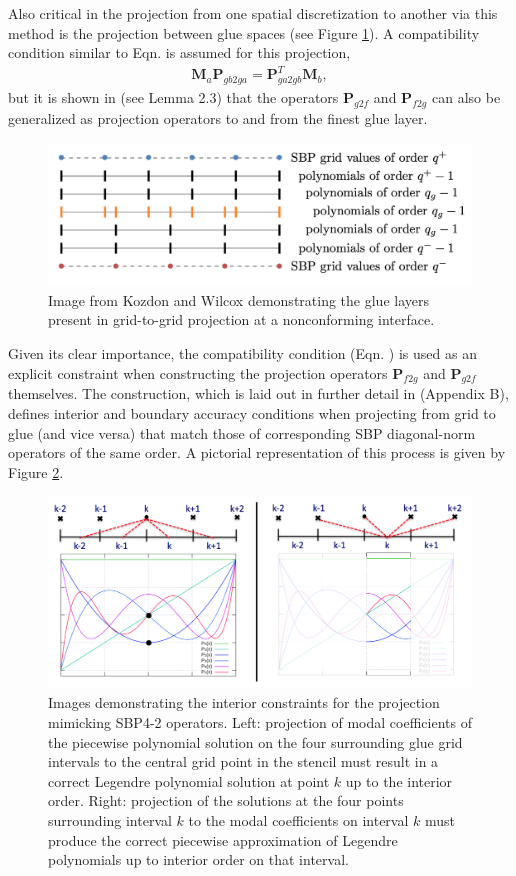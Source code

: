 Also critical in the projection from one spatial discretization to another via this
method is the projection between glue spaces (see Figure \ref{fig:glue_layers}). A
compatibility condition similar to Eqn.  is assumed for this projection,
\begin{align}
	\pmb{M}_{a}\pmb{P}_{gb2ga} = \pmb{P}_{ga2gb}^{T}\pmb{M}_{b}, \label{eq:compat_glues}
\end{align}
but it is shown in \cite{kozdon2016stable} (see Lemma 2.3) that the operators $\pmb{P}_{g2f}$ and
$\pmb{P}_{f2g}$ can also be generalized as projection operators to and from the finest
glue layer.
\begin{figure}
\centering
\includegraphics[width=0.8\linewidth,trim=4 4 4 4,clip]{figures/glue_layers.png}
\caption{Image from Kozdon and Wilcox \cite{kozdon2016stable} demonstrating the glue
         layers present in grid-to-grid projection at a nonconforming interface.}
\label{fig:glue_layers}
\end{figure}
Given its clear importance, the compatibility condition (Eqn. ) is used as an explicit
constraint when constructing the projection operators $\pmb{P}_{f2g}$ and $\pmb{P}_{g2f}$
themselves. The construction, which is laid out in further detail in \cite{kozdon2016stable} (Appendix B),
defines interior and boundary accuracy conditions when projecting from grid to glue
(and vice versa) that match those of corresponding SBP diagonal-norm operators of the
same order. A pictorial representation of this process is given by Figure \ref{fig:projection_layout}.
\begin{figure}
\centering
\includegraphics[width=0.9\linewidth,trim=4 4 4 4,clip]{figures/projection_layout.png}
\caption{Images demonstrating the interior constraints for the projection mimicking SBP4-2
	 operators. Left: projection of modal coefficients of the piecewise polynomial solution
	 on the four surrounding glue grid intervals to the central grid point in the stencil must
	 result in a correct Legendre polynomial solution at point $k$ up to the interior order.
	 Right: projection of the solutions at the four points surrounding interval $k$ to the
	 modal coefficients on interval $k$ must produce the correct piecewise approximation of
	 Legendre polynomials up to interior order on that interval.}
\label{fig:projection_layout}
\end{figure}
